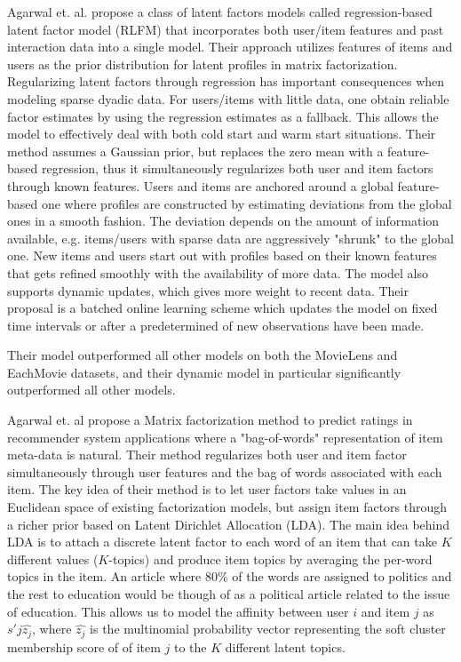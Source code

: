 Agarwal et. al. \cite{Agarwal2009} propose a class of latent factors models
called regression-based latent factor model (RLFM) that incorporates both
user/item features and past interaction data into a single model. Their
approach utilizes features of items and users as the prior distribution for
latent profiles in matrix factorization. Regularizing latent factors through
regression has important consequences when modeling sparse dyadic data. For
users/items with little data, one obtain reliable factor estimates by using the
regression estimates as a fallback. This allows the model to effectively deal
with both cold start and warm start situations. Their method assumes a Gaussian
prior, but replaces the zero mean with a feature-based regression, thus it
simultaneously regularizes both user and item factors through known features.
Users and items are anchored around a global feature-based one where profiles
are constructed by estimating deviations from the global ones in a smooth
fashion. The deviation depends on the amount of information available, e.g.
items/users with sparse data are aggressively "shrunk" to the global one. New
items and users start out with profiles based on their known features that gets
refined smoothly with the availability of more data. The model also supports
dynamic updates, which gives more weight to recent data. Their proposal is a
batched online learning scheme which updates the model on fixed time intervals
or after a predetermined of new observations have been made.

Their model outperformed all other models on both the MovieLens and EachMovie
datasets, and their dynamic model in particular significantly outperformed all
other models.


Agarwal et. al \cite{Agarwal2010} propose a Matrix factorization method to
predict ratings in recommender system applications where a "bag-of-words"
representation of item meta-data is natural. Their method regularizes both user
and item factor simultaneously through user features and the bag of words
associated with each item. The key idea of their method is to let user factors
take values in an Euclidean space of existing factorization models, but assign
item factors through a richer prior based on Latent Dirichlet Allocation (LDA).
The main idea behind LDA is to attach a discrete latent factor to each word of
an item that can take $K$ different values ($K$-topics) and produce item topics
by averaging the per-word topics in the item. An article where 80$\%$ of the
words are assigned to politics and the rest to education would be though of as
a political article related to the issue of education. This allows us to model
the affinity between user $i$ and item $j$ as $s'{j}\hat{z_{j}}$, where
$\hat{z_{j}}$ is the multinomial probability vector representing the soft
cluster membership score of of item $j$ to the $K$ different latent topics.

